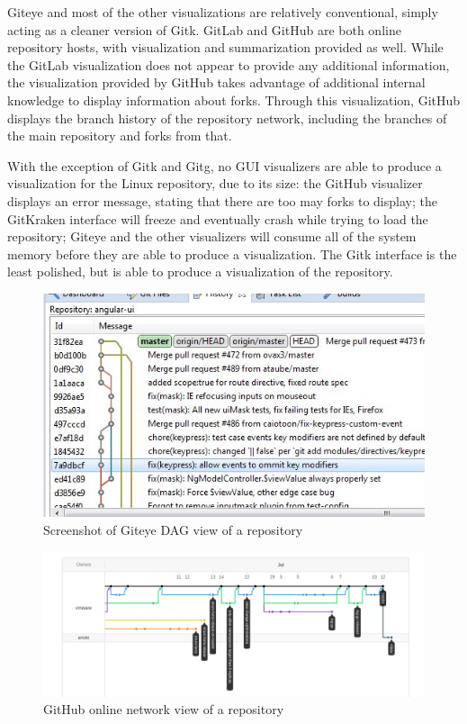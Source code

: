 Giteye\cite{giteye} and most of the other visualizations are relatively
conventional, simply acting as a cleaner version of Gitk.
GitLab\cite{gitlab} and
GitHub\cite{github} are both online repository hosts, with
visualization and summarization provided as well. While the GitLab
visualization does not appear to provide any additional information, the
visualization provided by GitHub takes advantage of additional internal
knowledge to display information about forks. Through this
visualization, GitHub displays the branch history of the repository
network, including the branches of the main repository and forks from
that.

With the exception of Gitk and Gitg, no GUI visualizers
are able to produce a visualization for the Linux repository, due to its
size: the GitHub visualizer displays an error message, stating that
there are too may forks to display; the GitKraken interface will freeze
and eventually crash while trying to load the repository; Giteye
and the other visualizers will consume all of the system memory before
they are able to produce a visualization. The Gitk interface is the
least polished, but is able to produce a visualization of the
repository.

\begin{figure}[htpb]
  \centering
  \includegraphics[width=0.8\linewidth]{Figures/introduction/giteye_graph.jpg}
  \caption{Screenshot of Giteye DAG view of a repository\cite{giteye}}
  \label{fig:giteye_screenshot}
\end{figure}

\begin{figure}[htpb]
  \centering
  \includegraphics[width=0.8\linewidth]{Figures/introduction/github_dag.png}
  \caption{GitHub online network view of a repository\cite{github}}
  \label{fig:github_dag_screenshot}
\end{figure}

